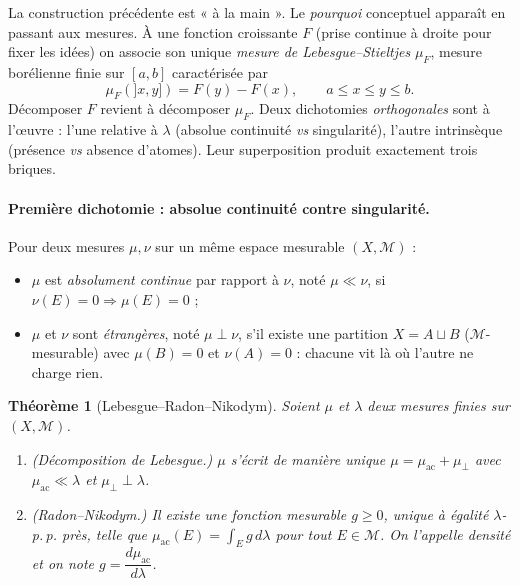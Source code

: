 \documentclass[11pt]{article}
\theoremstyle{thmblue}
\newtheorem{theoreme}{Théorème}[section]
\theoremstyle{defplain}
\theoremstyle{rem}
\newcommand{\pp}{p.\,p.}
\begin{document}
La construction précédente est « à la main ». Le \emph{pourquoi} conceptuel apparaît en passant aux
mesures. À une fonction croissante $F$ (prise continue à droite pour fixer les idées) on associe son
unique \emph{mesure de Lebesgue--Stieltjes} $\mu_F$, mesure borélienne finie sur $[a,b]$ caractérisée
par
\[
\mu_F(]x,y])=F(y)-F(x),\qquad a\le x\le y\le b.
\]
Décomposer $F$ revient à décomposer $\mu_F$. Deux dichotomies \emph{orthogonales} sont à l'œuvre :
l'une relative à $\lambda$ (absolue continuité \emph{vs} singularité), l'autre intrinsèque (présence
\emph{vs} absence d'atomes). Leur superposition produit exactement trois briques.

\paragraph{Première dichotomie : absolue continuité contre singularité.}
Pour deux mesures $\mu,\nu$ sur un même espace mesurable $(X,\mathcal M)$ :
\begin{itemize}[leftmargin=1.6em,itemsep=1pt]
  \item $\mu$ est \emph{absolument continue} par rapport à $\nu$, noté $\mu\ll\nu$, si
  $\nu(E)=0\Rightarrow\mu(E)=0$ ;
  \item $\mu$ et $\nu$ sont \emph{étrangères}, noté $\mu\perp\nu$, s'il existe une partition
  $X=A\sqcup B$ ($\mathcal M$-mesurable) avec $\mu(B)=0$ et $\nu(A)=0$ : chacune vit là où l'autre ne
  charge rien.
\end{itemize}

\begin{theoreme}[Lebesgue--Radon--Nikodym]\label{thm:lrn}
Soient $\mu$ et $\lambda$ deux mesures \emph{finies} sur $(X,\mathcal M)$.
\begin{enumerate}[label=\textup{(\roman*)},leftmargin=2.4em,itemsep=1pt]
  \item \textup{(Décomposition de Lebesgue.)} $\mu$ s'écrit de manière \emph{unique}
  $\mu=\mu_{\mathrm{ac}}+\mu_{\perp}$ avec $\mu_{\mathrm{ac}}\ll\lambda$ et $\mu_{\perp}\perp\lambda$.
  \item \textup{(Radon--Nikodym.)} Il existe une fonction mesurable $g\ge0$, unique à égalité
  $\lambda$-\pp{} près, telle que $\mu_{\mathrm{ac}}(E)=\int_E g\,d\lambda$ pour tout $E\in\mathcal M$.
  On l'appelle \emph{densité} et on note $g=\dfrac{d\mu_{\mathrm{ac}}}{d\lambda}$.
\end{enumerate}
\end{theoreme}
\end{document}
